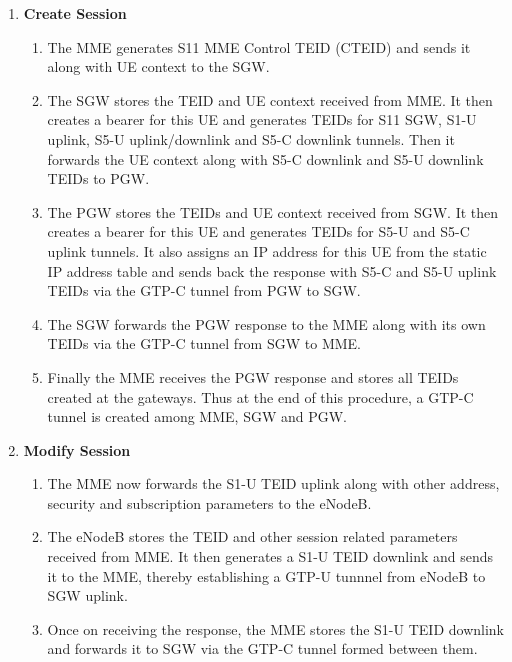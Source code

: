 \documentclass[hidelinks]{report}
\begin{document}
\begin{enumerate}

\item \textbf{Create Session}

\begin{enumerate}

\item The MME generates S11 MME Control TEID (CTEID) and sends it along with UE context to the SGW. 

\item The SGW stores the TEID and UE context received from MME. It then creates a bearer for this UE and generates TEIDs for S11 SGW, S1-U uplink, S5-U uplink/downlink and S5-C downlink tunnels. Then it forwards the UE context along with S5-C downlink and S5-U downlink TEIDs to PGW.

\item The PGW stores the TEIDs and UE context received from SGW. It then creates a bearer for this UE and generates TEIDs for S5-U and S5-C uplink tunnels. It also assigns an IP address for this UE from the static IP address table and sends back the response with S5-C and S5-U uplink TEIDs via the GTP-C tunnel from PGW to SGW.

\item The SGW forwards the PGW response to the MME along with its own TEIDs via the GTP-C tunnel from SGW to MME.

\item Finally the MME receives the PGW response and stores all TEIDs created at the gateways. Thus at the end of this procedure, a GTP-C tunnel is created among MME, SGW and PGW. 

\end{enumerate}

\item \textbf{Modify Session}

\begin{enumerate}

\item The MME now forwards the S1-U TEID uplink along with other address, security and subscription parameters to the eNodeB.

\item The eNodeB stores the TEID and other session related parameters received from MME. It then generates a S1-U TEID downlink and sends it to the MME, thereby establishing a GTP-U tunnnel from eNodeB to SGW uplink.

\item Once on receiving the response, the MME stores the S1-U TEID downlink and forwards it to SGW via the GTP-C tunnel formed between them.


\end{enumerate}
\end{enumerate}
\end{document}
